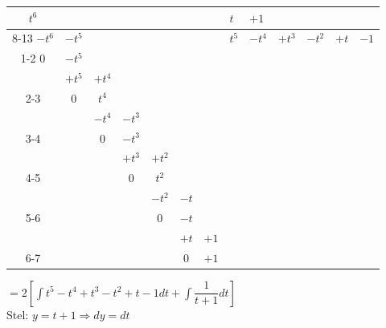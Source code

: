 \documentclass[a4paper]{article}
\newcommand{\adR}{\Rightarrow} %
\newcommand{\Lv}{\left[} %
\newcommand{\Rv}{\right]}
\newcommand{\intgrl}{\displaystyle\int} %
\begin{document}
\begin{tabular}{ccccccc|llllll}
$t^6$  &          &          &          &          &        &        &  $t$    &  $+1$    &          &          &        &  \\  \cline{8-13}
$-t^6$  &  $-t^5$   &          &          &          &        &        &  $t^5$  &  $-t^4$  &  $+t^3$  &  $-t^2$  &  $+t$  &  $-1$  \\ \cline{1-2}
$0$    &  $-t^5$  &          &          &          &        &        &         &          &          &          &        &  \\ 
       &  $+t^5$  &  $+t^4$  &          &          &        &        &         &          &          &          &        &  \\ \cline{2-3}
       &  $0$     &  $t^4$   &          &          &        &        &         &          &          &          &        &  \\ 
       &          &  $-t^4$   &  $-t^3$   &          &        &        &         &          &          &          &        &  \\ \cline{3-4}
       &          &  $0$     &  $-t^3$  &          &        &        &         &          &          &          &        &  \\
       &          &          &  $+t^3$  &  $+t^2$  &        &        &         &          &          &          &        &  \\ \cline{4-5}
       &          &          &  $0$     &  $t^2$   &        &        &         &          &          &          &        &  \\
       &          &          &          &  $-t^2$   &  $-t$   &        &         &          &          &          &        &  \\ \cline{5-6}
       &          &          &          &  $0$     &  $-t$  &        &         &          &          &          &        &  \\
       &          &          &          &          &  $+t$  &  $+1$  &         &          &          &          &        &  \\ \cline{6-7}
       &          &          &          &          &  $0$   &  $+1$  &         &          &          &          &        & \\ 
\end{tabular}

$= 2 \Lv \intgrl t^5 -t^4 +t^3 -t^2 +t -1 dt + \intgrl \dfrac{1}{t+1} dt \Rv$\\

Stel: $y = t+1 \adR dy = dt$\\
\end{document}
